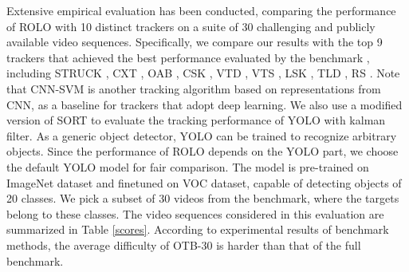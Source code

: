 \documentclass{article}
\begin{document}

Extensive empirical evaluation has been conducted, comparing the performance of ROLO with 10 distinct trackers on a suite of 30 challenging and publicly available video sequences.
Specifically, we compare our results with the top 9 trackers that achieved the best performance evaluated by the benchmark \citep{wu2015object}, including STRUCK \citep{7360205}, CXT \citep{dinh2011context}, OAB \citep{grabner2006real}, CSK \citep{henriques2012exploiting}, VTD \citep{kwon2010visual}, VTS \citep{kwon2011tracking}, LSK \citep{liu2011robust}, TLD \citep{kalal2010pn}, RS \citep{collins2005online}. 
Note that CNN-SVM \citep{hong2015tracking} is another tracking algorithm based on representations from CNN, as a baseline for trackers that adopt deep learning. 
We also use a modified version of SORT \citep{bewley2015sort} to evaluate the tracking performance of YOLO with kalman filter.
As a generic object detector, YOLO can be trained to recognize arbitrary objects. 
Since the performance of ROLO depends on the YOLO part, 
we choose the default YOLO model for fair comparison. The model is pre-trained on ImageNet dataset and finetuned on VOC dataset, 
capable of detecting objects of 20 classes. 
We pick a subset of 30 videos from the benchmark, where the targets belong to these classes.
The video sequences considered in this evaluation are summarized in Table \ref{scores}. According to experimental results of benchmark methods, the average difficulty of OTB-30 is harder than that of the full benchmark.


\end{document}
